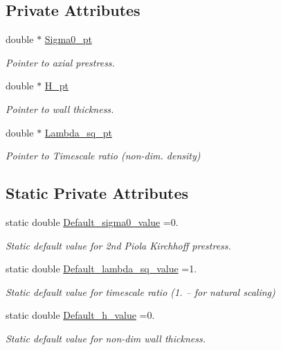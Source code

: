 \subsection*{Private Attributes}
\begin{DoxyCompactItemize}
\item 
double $\ast$ \hyperlink{classoomph_1_1KirchhoffLoveBeamEquations_a87d8ff0b264ae3327ee44975774f8c2f}{Sigma0\+\_\+pt}
\begin{DoxyCompactList}\small\item\em Pointer to axial prestress. \end{DoxyCompactList}\item 
double $\ast$ \hyperlink{classoomph_1_1KirchhoffLoveBeamEquations_adec17e53f30e371f899241ba2b2dfe2e}{H\+\_\+pt}
\begin{DoxyCompactList}\small\item\em Pointer to wall thickness. \end{DoxyCompactList}\item 
double $\ast$ \hyperlink{classoomph_1_1KirchhoffLoveBeamEquations_a700cd4aa2ac90f41b019839610981633}{Lambda\+\_\+sq\+\_\+pt}
\begin{DoxyCompactList}\small\item\em Pointer to Timescale ratio (non-\/dim. density) \end{DoxyCompactList}\end{DoxyCompactItemize}
\subsection*{Static Private Attributes}
\begin{DoxyCompactItemize}
\item 
static double \hyperlink{classoomph_1_1KirchhoffLoveBeamEquations_a22ce2707713186c808aedc32bd12be3c}{Default\+\_\+sigma0\+\_\+value} =0.
\begin{DoxyCompactList}\small\item\em Static default value for 2nd Piola Kirchhoff prestress. \end{DoxyCompactList}\item 
static double \hyperlink{classoomph_1_1KirchhoffLoveBeamEquations_a965ef43850af9f156cc46d35d536edc1}{Default\+\_\+lambda\+\_\+sq\+\_\+value} =1.
\begin{DoxyCompactList}\small\item\em Static default value for timescale ratio (1. -- for natural scaling) \end{DoxyCompactList}\item 
static double \hyperlink{classoomph_1_1KirchhoffLoveBeamEquations_a8761f159953be81594eee6432c94790d}{Default\+\_\+h\+\_\+value} =0.
\begin{DoxyCompactList}\small\item\em Static default value for non-\/dim wall thickness. \end{DoxyCompactList}\end{DoxyCompactItemize}
